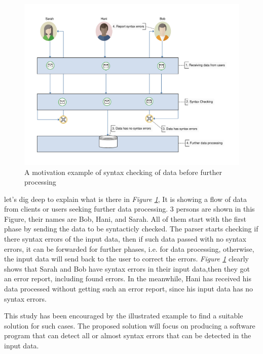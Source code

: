 	\begin{figure}[ht]
		\begin{center}
			\includegraphics[scale=0.5,angle=0]{images/motivation}
			\caption{A motivation example of syntax checking of data before further processing}
			\label{Fig:Motivation}
		\end{center}
	\end{figure}
	\vspace{8mm} %
	
	let's dig deep to explain what is there in  {\it Figure \ref{Fig:Motivation}}, It is showing a flow of data from clients or users seeking further data processing. 3 persons are shown in this Figure, their names are Bob, Hani, and Sarah. All of them start with the first phase by sending the data to be syntacticly checked. The parser starts checking if there syntax errors of the input data, then if such data passed with no syntax errors, it can be forwarded for further phases, i.e. for data processing, otherwise, the input data will send back to the user to correct the errors. {\it Figure \ref{Fig:Motivation}} clearly shows that Sarah and Bob have syntax errors in their input data,then they got an error report, including found errors. In the meanwhile, Hani has received his data processed without getting such an error report, since his input data has no syntax errors. 
			\vspace{5mm} %
			\par
			This study has been encouraged by the illustrated example to find a suitable solution for such cases. The proposed solution will focus on producing a software program that can detect all or almost syntax errors that can be detected in the input data. 

